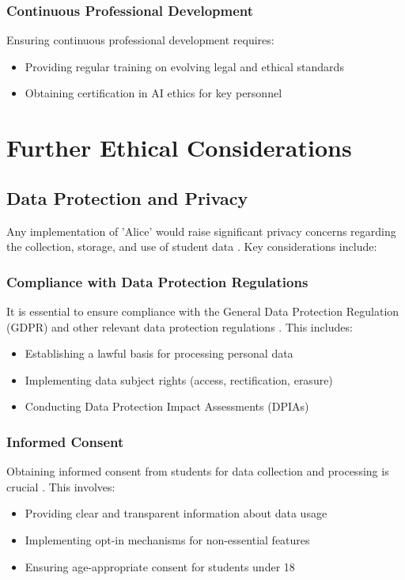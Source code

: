 \documentclass[15pt,a4paper]{article}
\begin{document}
\begin{multicols}{2}
\subsubsection*{Continuous Professional Development}
Ensuring continuous professional development \textit{\parencite{CIPD2024}} requires:
\begin{itemize}
    \item Providing regular training on evolving legal and ethical standards
    \item Obtaining certification in AI ethics for key personnel
\end{itemize}

\section{Further Ethical Considerations}
\subsection{Data Protection and Privacy}
Any implementation of 'Alice' would raise significant privacy concerns regarding the collection, storage, and use of student data \textit{\parencite[pp. 366-370]{Annus2023}}. Key considerations include:

\subsubsection*{Compliance with Data Protection Regulations}
It is essential to ensure compliance with the General Data Protection Regulation (GDPR) and other relevant data protection regulations \textit{\parencite{ICO2024}}. This includes:
\begin{itemize}
    \item Establishing a lawful basis for processing personal data
    \item Implementing data subject rights (access, rectification, erasure)
    \item Conducting Data Protection Impact Assessments (DPIAs)
\end{itemize}

\subsubsection*{Informed Consent}
Obtaining informed consent from students for data collection and processing is crucial \textit{\parencite{EDPB2023}}. This involves:
\begin{itemize}
    \item Providing clear and transparent information about data usage
    \item Implementing opt-in mechanisms for non-essential features
    \item Ensuring age-appropriate consent for students under 18
\end{itemize}


\end{multicols}
\end{document}

